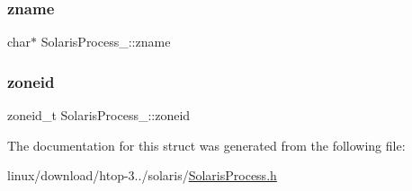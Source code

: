 \subsubsection{\texorpdfstring{zname}{zname}}
{\footnotesize\ttfamily char$\ast$ Solaris\+Process\+\_\+\+::zname}

\mbox{\label{structSolarisProcess___ae723b7dd252366e19354c0782a288e34}} 
\subsubsection{\texorpdfstring{zoneid}{zoneid}}
{\footnotesize\ttfamily zoneid\+\_\+t Solaris\+Process\+\_\+\+::zoneid}



The documentation for this struct was generated from the following file\+:\begin{DoxyCompactItemize}
\item 
linux/download/htop-\/3../solaris/\hyperlink{SolarisProcess_8h}{Solaris\+Process.\+h}\end{DoxyCompactItemize}
